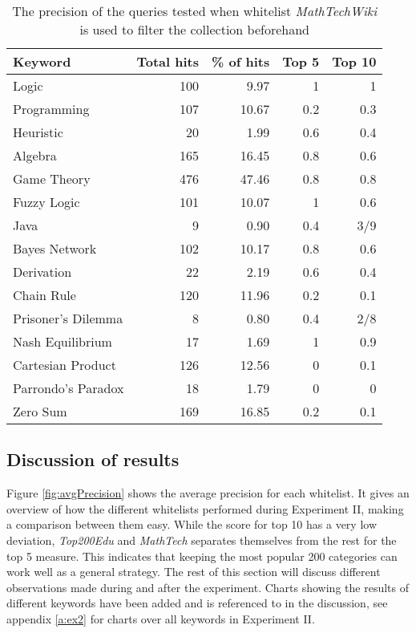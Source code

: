 \begin{table}[h]
\centering
\small
\begin{tabular} {|| p{10em} | r | r | r | r ||} 
 \hline
 Keyword & Total hits & \% of hits & Top 5 & Top 10 \\ [0.5ex] 
 \hline

Logic & 100 & 9.97 & 1 & 1 \\
Programming & 107 & 10.67 & 0.2 & 0.3 \\
Heuristic & 20 & 1.99 & 0.6 & 0.4 \\
Algebra & 165 & 16.45 & 0.8 & 0.6 \\
Game Theory & 476 & 47.46 & 0.8 & 0.8 \\
\hline
Fuzzy Logic & 101 & 10.07 & 1 & 0.6 \\
Java & 9 & 0.90 & 0.4 & 3/9 \\
Bayes Network & 102 & 10.17 & 0.8 & 0.6 \\
Derivation & 22 & 2.19 & 0.6 & 0.4 \\
\hline
Chain Rule & 120 & 11.96 & 0.2 & 0.1 \\
Prisoner's Dilemma & 8 & 0.80 & 0.4 & 2/8 \\
Nash Equilibrium & 17 & 1.69 & 1 & 0.9 \\
Cartesian Product & 126 & 12.56 & 0 & 0.1 \\
Parrondo's Paradox & 18 & 1.79 & 0 & 0 \\
Zero Sum & 169 & 16.85 & 0.2 & 0.1 \\

 \hline
\end{tabular}
\caption{The precision of the queries tested when whitelist \textit{MathTechWiki} is used to filter the collection beforehand}
\label{table:p_test_list4}
\end{table}
\clearpage



\subsection{Discussion of results}



Figure \ref{fig:avgPrecision} shows the average precision for each whitelist. It gives an overview of how the different whitelists performed during Experiment II, making a comparison between them easy. While the score for top 10 has a very low deviation, \textit{Top200Edu} and \textit{MathTech} separates themselves from the rest for the top 5 measure. This indicates that keeping the most popular 200 categories can work well as a general strategy. The rest of this section will discuss different observations made during and after the experiment. Charts showing the results of different keywords have been added and is referenced to in the discussion, see appendix \ref{a:ex2} for charts over all keywords in Experiment II.

